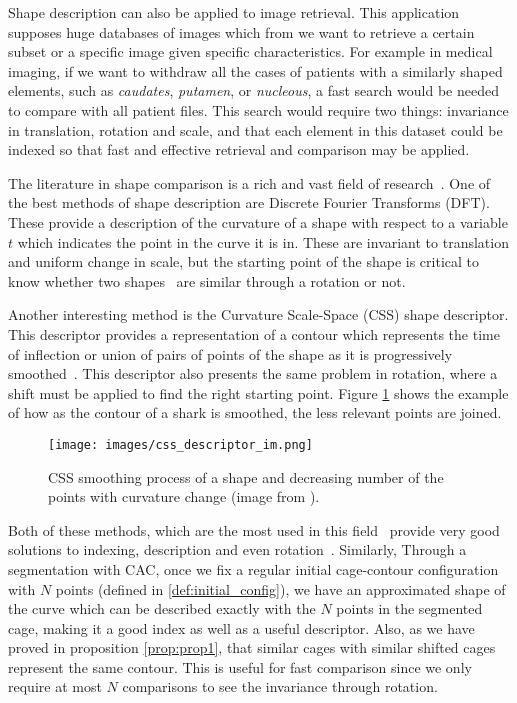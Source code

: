 Shape description can also be applied to image retrieval. This application supposes huge databases of images which from we want to retrieve a certain subset or a specific image given specific characteristics. For example in medical imaging, if we want to withdraw all the cases of patients with a similarly shaped elements, such as \textit{caudates}, \textit{putamen}, or \textit{nucleous}, a fast search would be needed to compare with all patient files. This search would require two things: invariance in translation, rotation and scale, and that each element in this dataset could be indexed so that fast and effective retrieval and comparison may be applied. 

The literature in shape comparison is a rich and vast field of research~\cite{Bartolini:2005:WAR:1032293.1032578, Abbasi:1999:CSS:323498.323506}. One of the best methods of shape description are Discrete Fourier Transforms (DFT). These provide a description of the curvature of a shape with respect to a variable $t$ which indicates the point in the curve it is in. These are invariant to translation and uniform change in scale, but the starting point of the shape is critical to know whether two shapes~\cite{Bartolini:2005:WAR:1032293.1032578} are similar through a rotation or not. 

Another interesting method is the Curvature Scale-Space (CSS) shape descriptor. This descriptor provides a representation of a contour which represents the time of inflection or union of pairs of points of the shape as it is progressively smoothed~\cite{Abbasi:1999:CSS:323498.323506}. This descriptor also presents the same problem in rotation, where a shift must be applied to find the right starting point. Figure \ref{fig:css_descriptor_im} shows the example of how as the contour of a shark is smoothed, the less relevant points are joined.

  \begin{figure}[h!]
  	\centering
  	{\texttt{[image: images/css\_descriptor\_im.png]}}
  	\caption{CSS smoothing process of a shape and decreasing number of the points with curvature change (image from \cite{Abbasi:1999:CSS:323498.323506}).} 	
  	\label{fig:css_descriptor_im}
  \end{figure}

Both of these methods, which are the most used in this field~\cite{5963789,Zhang200339} provide very good solutions to indexing, description and even rotation~\cite{Zhang200339}. Similarly, Through a segmentation with CAC, once we fix a regular initial cage-contour configuration with $N$ points (defined in \ref{def:initial_config}), we have an approximated shape of the curve which can be described exactly with the $N$ points in the segmented cage, making it a good index as well as a useful descriptor. Also, as we have proved in proposition \ref{prop:prop1}, that similar cages with similar shifted cages represent the same contour. This is useful for fast comparison since we only require at most $N$ comparisons to see the invariance through rotation.

